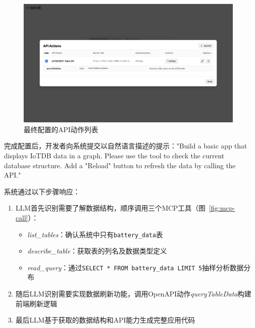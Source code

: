 \begin{figure}[H]
  \centering
  \includegraphics[width=\textwidth]{figures/screenshots/iotdb-demo/api-actions.png}
  \caption{最终配置的API动作列表}
  \label{fig:api-actions}
\end{figure}

完成配置后，开发者向系统提交以自然语言描述的提示："Build a basic app that displays IoTDB data in a graph. Please use the tool to check the current database structure. Add a "Reload" button to refresh the data by calling the API."


系统通过以下步骤响应：

\begin{enumerate}
  \item LLM首先识别需要了解数据结构，顺序调用三个MCP工具（图~\ref{fig:mcp-call}）：
    \begin{itemize}
      \item \textit{list\_tables}：确认系统中只有\texttt{battery\_data}表
      \item \textit{describe\_table}：获取表的列名及数据类型定义
      \item \textit{read\_query}：通过\verb|SELECT * FROM battery_data LIMIT 5|抽样分析数据分布
    \end{itemize}
  
  \item 随后LLM识别需要实现数据刷新功能，调用OpenAPI动作\textit{queryTableData}构建前端刷新逻辑
  
  \item 最后LLM基于获取的数据结构和API能力生成完整应用代码
\end{enumerate}

